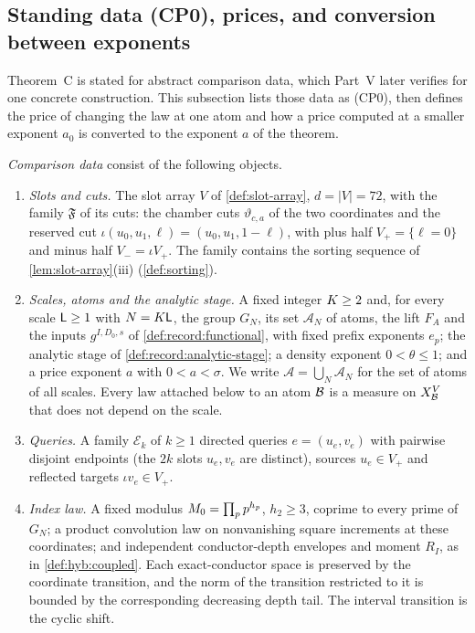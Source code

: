 \subsection{Standing data (CP0), prices, and conversion between exponents}\label{subsec:cp:prices}

Theorem~C is stated for abstract comparison data, which Part~V
later verifies for one concrete construction. This subsection lists
those data as (CP0), then defines the price of changing the law at
one atom and how a price computed at a smaller exponent $a_0$ is
converted to the exponent $a$ of the theorem.

\begin{definition}\label{def:cp0}
\emph{Comparison data} consist of the following objects.
\begin{enumerate}[label=(\alph*)]
\item\emph{Slots and cuts.} The slot array $V$ of \cref{def:slot-array},
 $d=|V|=72$, with the family $\mathfrak F$ of its cuts: the chamber cuts
 $\vartheta_{c,a}$ of the two coordinates and the reserved cut
 $\iota(u_0,u_1,\ell)=(u_0,u_1,1-\ell)$, with plus half $V_+=\{\ell=0\}$ and
 minus half $V_-=\iota V_+$. The family contains the sorting sequence of
 \cref{lem:slot-array}(iii) (\cref{def:sorting}).
\item\emph{Scales, atoms and the analytic stage.} A fixed integer $K\ge2$
 and, for every scale $\mathsf L\ge1$ with $N=K\mathsf L$, the group $G_N$, its set
 $\mathcal A_N$ of atoms, the lift $F_A$ and the inputs $g^{I,D_0,s}$ of
 \cref{def:record:functional}, with fixed prefix exponents $e_p$; the
 analytic stage of \cref{def:record:analytic-stage}; a density exponent
 $0<\theta\le1$; and a price exponent $a$ with $0<a<\sigma$. We write
 $\mathcal A=\bigcup_N\mathcal A_N$ for the set of atoms of all scales. Every
 law attached below to an atom $\mathcal B$ is a measure on $X_{\mathcal B}^V$ that does
 not depend on the scale.
\item\emph{Queries.} A family $\mathcal E_k$ of $k\ge1$ directed queries
 $e=(u_e,v_e)$ with pairwise disjoint endpoints (the $2k$ slots $u_e,v_e$ are
 distinct), sources $u_e\in V_+$ and reflected targets $\iota v_e\in V_+$.
\item\emph{Index law.} A fixed modulus $M_0=\prod_p p^{h_p}$,
 $h_2\ge3$, coprime to every prime of $G_N$; a product convolution law
 on nonvanishing square increments at these coordinates; and independent
 conductor-depth envelopes and moment $R_I$, as in
 \cref{def:hyb:coupled}. Each exact-conductor space is preserved by the
 coordinate transition, and the norm of the transition restricted
 to it is bounded by the corresponding decreasing depth tail. The interval transition is the cyclic shift.
\end{enumerate}
\end{definition}

